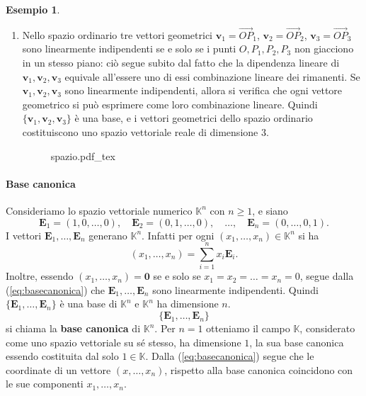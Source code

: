 \documentclass{article}
\theoremstyle{plain}
\theoremstyle{definition}
\newtheorem{exmp}{Esempio}[section]
\theoremstyle{remark}
\newcommand{\incfig}[2][\columnwidth]{%
    \def\svgwidth{#1}
    {#2.pdf_tex}
}
\begin{document}
\begin{exmp}
\begin{enumerate}
        \item Nello spazio ordinario tre vettori geometrici \( \mathbf{v}_1 = \overrightarrow{OP}_1 \), \( \mathbf{v}_2 = \overrightarrow{OP}_2 \), \( \mathbf{v}_3 = \overrightarrow{OP}_3 \) sono linearmente 
        indipendenti se e solo se i punti \( O, P_1, P_2, P_3 \) non giacciono in un stesso piano: ciò segue subito dal fatto che la dipendenza lineare di \( \mathbf{v}_1, \mathbf{v}_2, \mathbf{v}_3 \) 
        equivale all'essere uno di essi combinazione lineare dei rimanenti. 
        Se \( \mathbf{v}_1, \mathbf{v}_2, \mathbf{v}_3 \) sono linearmente indipendenti, allora si verifica che ogni vettore geometrico si può esprimere come loro combinazione lineare. 
        Quindi \( \{\mathbf{v}_1, \mathbf{v}_2, \mathbf{v}_3\} \) è una base, e i vettori geometrici dello spazio ordinario costituiscono uno spazio vettoriale reale di dimensione $3$.
        \begin{figure}[H]
            \centering
            \incfig[0.6\linewidth]{spazio}
        \end{figure}
    \end{enumerate}
\end{exmp}

\vspace{10pt}

\paragraph{Base canonica}
Consideriamo lo spazio vettoriale numerico \( \mathbb{K}^n \) con $n\geq 1$, e siano
\[ \mathbf{E}_1 = (1, 0, \ldots, 0), \quad \mathbf{E}_2 = (0, 1, \ldots, 0),\quad \ldots, \quad \mathbf{E}_n = (0, \ldots, 0, 1). \]
I vettori \( \mathbf{E}_1, \ldots, \mathbf{E}_n \) generano \( \mathbb{K}^n \). Infatti per ogni \( (x_1, \ldots, x_n) \in \mathbb{K}^n \) si ha
\begin{equation}
    (x_1, \ldots, x_n) = \sum_{i=1}^{n}x_i\mathbf{E}_i.\label{eq:basecanonica}
\end{equation}
Inoltre, essendo \( (x_1, \ldots, x_n) = \mathbf{0} \) se e solo se \( x_1 = x_2 = \ldots = x_n = 0 \), segue dalla (\ref{eq:basecanonica}) che \( \mathbf{E}_1, \ldots, \mathbf{E}_n \) sono linearmente indipendenti. 
Quindi \( \{\mathbf{E}_1, \ldots, \mathbf{E}_n\} \) è una base di \( \mathbb{K}^n \) e \( \mathbb{K}^n \) ha dimensione \( n \).
\[ \{\mathbf{E}_1, \ldots, \mathbf{E}_n\} \] si chiama la \textbf{base canonica} di \( \mathbb{K}^n \).
Per \( n = 1 \) otteniamo il campo \( \mathbb{K} \), considerato come uno spazio vettoriale su sé stesso, ha dimensione $1$, la sua base canonica essendo costituita dal solo \( 1 \in \mathbb{K} \).
Dalla (\ref{eq:basecanonica}) segue che le coordinate di un vettore \( (x, \ldots, x_n) \), rispetto alla base canonica coincidono con le sue componenti \( x_1, \ldots, x_n \).
\end{document}
